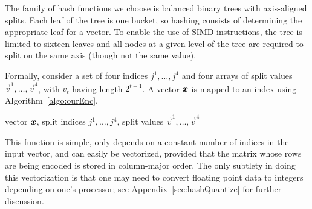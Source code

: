 The family of hash functions we choose is balanced binary trees with axis-aligned splits. Each leaf of the tree is one bucket, so hashing consists of determining the appropriate leaf for a vector. To enable the use of SIMD instructions, the tree is limited to sixteen leaves and all nodes at a given level of the tree are required to split on the same axis (though not the same value).


Formally, consider a set of four indices ${j^1,\ldots,j^4}$ and four arrays of split values $\vec{v}^1,\ldots,\vec{v}^4$, with $v_t$ having length $2^{t-1}$. A vector $\bm{x}$ is mapped to an index using Algorithm~\ref{algo:ourEnc}.
\begin{algorithm}[t]
\caption{\oursHash} \label{algo:ourEnc}
\begin{algorithmic}[1]
     vector $\bm{x}$, split indices ${j^1,\ldots,j^4}$, split values $\vec{v}^1,\ldots,\vec{v}^4$
      
       
      
     
    \ENDFOR
\end{algorithmic}
\end{algorithm}
\vspace{-3mm}
This function is simple, only depends on a constant number of indices in the input vector, and can easily be vectorized, provided that the matrix whose rows are being encoded is stored in column-major order. The only subtlety in doing this vectorization is that one may need to convert floating point data to integers depending on one's processor; see Appendix~\ref{sec:hashQuantize} for further discussion.

